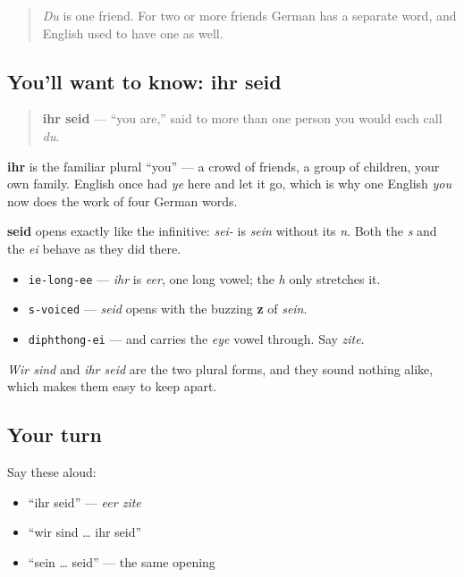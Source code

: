 \label{lesson:GE-C16-ihr-seid}



\begin{quote}
\emph{Du} is one friend. For two or more friends German has a separate word, and English used to have one as well.
\end{quote}

\subsection*{You'll want to know: ihr seid}
\begin{quote}
\textbf{ihr seid} — \textquotedblleft{}you are,\textquotedblright{} said to more than one person you would each call \emph{du}.
\end{quote}

\textbf{ihr} is the familiar plural \textquotedblleft{}you\textquotedblright{} — a crowd of friends, a group of children, your own family. English once had \emph{ye} here and let it go, which is why one English \emph{you} now does the work of four German words.

\textbf{seid} opens exactly like the infinitive: \emph{sei-} is \emph{sein} without its \emph{n}. Both the \emph{s} and the \emph{ei} behave as they did there.

\begin{sounds}
\begin{itemize}
\raggedright
  \item \texttt{ie-long-ee} — \emph{ihr} is \emph{eer}, one long vowel; the \emph{h} only stretches it.
  \item \texttt{s-voiced} — \emph{seid} opens with the buzzing \textbf{z} of \emph{sein}.
  \item \texttt{diphthong-ei} — and carries the \emph{eye} vowel through. Say \emph{zite}.
\end{itemize}

\emph{Wir sind} and \emph{ihr seid} are the two plural forms, and they sound nothing alike, which makes them easy to keep apart.
\end{sounds}

\subsection*{Your turn}
Say these aloud:

\begin{itemize}
\raggedright
  \item \textquotedblleft{}ihr seid\textquotedblright{} — \emph{eer zite}
  \item \textquotedblleft{}wir sind … ihr seid\textquotedblright{}
  \item \textquotedblleft{}sein … seid\textquotedblright{} — the same opening
\end{itemize}

